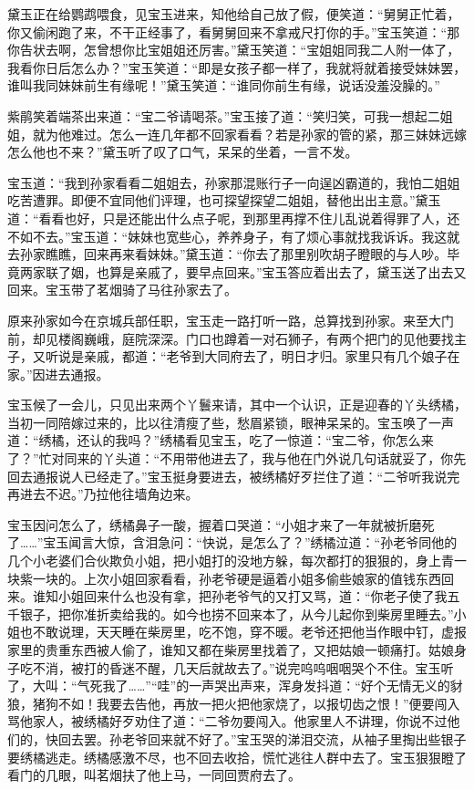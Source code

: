 \documentclass[12pt,oneside]{book}
\begin{document}
黛玉正在给鹦鹉喂食，见宝玉进来，知他给自己放了假，便笑道：“舅舅正忙着，你又偷闲跑了来，不干正经事了，看舅舅回来不拿戒尺打你的手。”宝玉笑道：“那你告状去啊，怎曾想你比宝姐姐还厉害。”黛玉笑道：“宝姐姐同我二人附一体了，我看你日后怎么办？”宝玉笑道：“即是女孩子都一样了，我就将就着接受妹妹罢，谁叫我同妹妹前生有缘呢！”黛玉笑道：“谁同你前生有缘，说话没羞没臊的。”

紫鹃笑着端茶出来道：“宝二爷请喝茶。”宝玉接了道：“笑归笑，可我一想起二姐姐，就为他难过。怎么一连几年都不回家看看？若是孙家的管的紧，那三妹妹远嫁怎么他也不来？”黛玉听了叹了口气，呆呆的坐着，一言不发。

宝玉道：“我到孙家看看二姐姐去，孙家那混账行子一向逞凶霸道的，我怕二姐姐吃苦遭罪。即便不宜同他们评理，也可探望探望二姐姐，替他出出主意。”黛玉道：“看看也好，只是还能出什么点子呢，到那里再撑不住儿乱说着得罪了人，还不如不去。”宝玉道：“妹妹也宽些心，养养身子，有了烦心事就找我诉诉。我这就去孙家瞧瞧，回来再来看妹妹。”黛玉道：“你去了那里别吹胡子瞪眼的与人吵。毕竟两家联了姻，也算是亲戚了，要早点回来。”宝玉答应着出去了，黛玉送了出去又回来。宝玉带了茗烟骑了马往孙家去了。

原来孙家如今在京城兵部任职，宝玉走一路打听一路，总算找到孙家。来至大门前，却见楼阁巍峨，庭院深深。门口也蹲着一对石狮子，有两个把门的见他要找主子，又听说是亲戚，都道：“老爷到大同府去了，明日才归。家里只有几个娘子在家。”因进去通报。

宝玉候了一会儿，只见出来两个丫鬟来请，其中一个认识，正是迎春的丫头绣橘，当初一同陪嫁过来的，比以往清瘦了些，愁眉紧锁，眼神呆呆的。宝玉唤了一声道：“绣橘，还认的我吗？”绣橘看见宝玉，吃了一惊道：“宝二爷，你怎么来了？”忙对同来的丫头道：“不用带他进去了，我与他在门外说几句话就妥了，你先回去通报说人已经走了。”宝玉挺身要进去，被绣橘好歹拦住了道：“二爷听我说完再进去不迟。”乃拉他往墙角边来。

宝玉因问怎么了，绣橘鼻子一酸，握着口哭道：“小姐才来了一年就被折磨死了……”宝玉闻言大惊，含泪急问：“快说，是怎么了？”绣橘泣道：“孙老爷同他的几个小老婆们合伙欺负小姐，把小姐打的没地方躲，每次都打的狠狠的，身上青一块紫一块的。上次小姐回家看看，孙老爷硬是逼着小姐多偷些娘家的值钱东西回来。谁知小姐回来什么也没有拿，把孙老爷气的又打又骂，道：“你老子使了我五千银子，把你准折卖给我的。如今也捞不回来本了，从今儿起你到柴房里睡去。”小姐也不敢说理，天天睡在柴房里，吃不饱，穿不暖。老爷还把他当作眼中钉，虚报家里的贵重东西被人偷了，谁知又都在柴房里找着了，又把姑娘一顿痛打。姑娘身子吃不消，被打的昏迷不醒，几天后就故去了。”说完呜呜咽咽哭个不住。宝玉听了，大叫：“气死我了……”“哇”的一声哭出声来，浑身发抖道：“好个无情无义的豺狼，猪狗不如！我要去告他，再放一把火把他家烧了，以报切齿之恨！”便要闯入骂他家人，被绣橘好歹劝住了道：“二爷勿要闯入。他家里人不讲理，你说不过他们的，快回去罢。孙老爷回来就不好了。”宝玉哭的涕泪交流，从袖子里掏出些银子要绣橘逃走。绣橘感激不尽，也不回去收拾，慌忙逃往人群中去了。宝玉狠狠瞪了看门的几眼，叫茗烟扶了他上马，一同回贾府去了。
\end{document}
